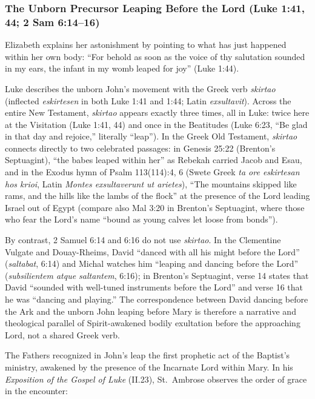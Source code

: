 \subsubsection{The Unborn Precursor Leaping Before the Lord (Luke 1:41, 44; 2 Sam 6:14--16)}

Elizabeth explains her astonishment by pointing to what has just happened within her own body: ``For behold as soon as the voice of thy salutation sounded in my ears, the infant in my womb leaped for joy'' (Luke 1:44).

Luke describes the unborn John's movement with the Greek verb \textit{skirtao} (inflected \textit{eskirtesen} in both Luke 1:41 and 1:44; Latin \textit{exsultavit}). Across the entire New Testament, \textit{skirtao} appears exactly three times, all in Luke: twice here at the Visitation (Luke 1:41, 44) and once in the Beatitudes (Luke 6:23, ``Be glad in that day and rejoice,'' literally ``leap''). In the Greek Old Testament, \textit{skirtao} connects directly to two celebrated passages: in Genesis 25:22 (Brenton's Septuagint), ``the babes leaped within her'' as Rebekah carried Jacob and Esau, and in the Exodus hymn of Psalm 113(114):4, 6 (Swete Greek \textit{ta ore eskirtesan hos krioi}, Latin \textit{Montes exsultaverunt ut arietes}), ``The mountains skipped like rams, and the hills like the lambs of the flock'' at the presence of the Lord leading Israel out of Egypt (compare also Mal 3:20 in Brenton's Septuagint, where those who fear the Lord's name ``bound as young calves let loose from bonds'').

By contrast, 2 Samuel 6:14 and 6:16 do not use \textit{skirtao}. In the Clementine Vulgate and Douay-Rheims, David ``danced with all his might before the Lord'' (\textit{saltabat}, 6:14) and Michal watches him ``leaping and dancing before the Lord'' (\textit{subsilientem atque saltantem}, 6:16); in Brenton's Septuagint, verse 14 states that David ``sounded with well-tuned instruments before the Lord'' and verse 16 that he was ``dancing and playing.'' The correspondence between David dancing before the Ark and the unborn John leaping before Mary is therefore a narrative and theological parallel of Spirit-awakened bodily exultation before the approaching Lord, not a shared Greek verb.

The Fathers recognized in John's leap the first prophetic act of the Baptist's ministry, awakened by the presence of the Incarnate Lord within Mary. In his \textit{Exposition of the Gospel of Luke} (II.23), St.\ Ambrose observes the order of grace in the encounter:

